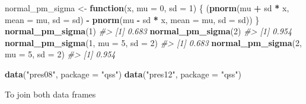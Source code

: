 \documentclass[]{book}
\newenvironment{Shaded}{\begin{snugshade}}{\end{snugshade}}
\newcommand{\CommentTok}[1]{\textcolor[rgb]{0.56,0.35,0.01}{\textit{#1}}}
\newcommand{\ControlFlowTok}[1]{\textcolor[rgb]{0.13,0.29,0.53}{\textbf{#1}}}
\newcommand{\DataTypeTok}[1]{\textcolor[rgb]{0.13,0.29,0.53}{#1}}
\newcommand{\DecValTok}[1]{\textcolor[rgb]{0.00,0.00,0.81}{#1}}
\newcommand{\KeywordTok}[1]{\textcolor[rgb]{0.13,0.29,0.53}{\textbf{#1}}}
\newcommand{\NormalTok}[1]{#1}
\newcommand{\OperatorTok}[1]{\textcolor[rgb]{0.81,0.36,0.00}{\textbf{#1}}}
\newcommand{\StringTok}[1]{\textcolor[rgb]{0.31,0.60,0.02}{#1}}
\theoremstyle{definition}
\theoremstyle{definition}
\theoremstyle{definition}
\theoremstyle{remark}
\begin{document}
\begin{Shaded}
\begin{Highlighting}[]
\NormalTok{normal_pm_sigma <-}\StringTok{ }\ControlFlowTok{function}\NormalTok{(x, }\DataTypeTok{mu =} \DecValTok{0}\NormalTok{, }\DataTypeTok{sd =} \DecValTok{1}\NormalTok{) \{}
\NormalTok{  (}\KeywordTok{pnorm}\NormalTok{(mu }\OperatorTok{+}\StringTok{ }\NormalTok{sd }\OperatorTok{*}\StringTok{ }\NormalTok{x, }\DataTypeTok{mean =}\NormalTok{ mu, }\DataTypeTok{sd =}\NormalTok{ sd) }\OperatorTok{-}
\StringTok{     }\KeywordTok{pnorm}\NormalTok{(mu }\OperatorTok{-}\StringTok{ }\NormalTok{sd }\OperatorTok{*}\StringTok{ }\NormalTok{x, }\DataTypeTok{mean =}\NormalTok{ mu, }\DataTypeTok{sd =}\NormalTok{ sd))}
\NormalTok{\}}
\KeywordTok{normal_pm_sigma}\NormalTok{(}\DecValTok{1}\NormalTok{)}
\CommentTok{#> [1] 0.683}
\KeywordTok{normal_pm_sigma}\NormalTok{(}\DecValTok{2}\NormalTok{)}
\CommentTok{#> [1] 0.954}
\KeywordTok{normal_pm_sigma}\NormalTok{(}\DecValTok{1}\NormalTok{, }\DataTypeTok{mu =} \DecValTok{5}\NormalTok{, }\DataTypeTok{sd =} \DecValTok{2}\NormalTok{)}
\CommentTok{#> [1] 0.683}
\KeywordTok{normal_pm_sigma}\NormalTok{(}\DecValTok{2}\NormalTok{, }\DataTypeTok{mu =} \DecValTok{5}\NormalTok{, }\DataTypeTok{sd =} \DecValTok{2}\NormalTok{)}
\CommentTok{#> [1] 0.954}
\end{Highlighting}
\end{Shaded}

\begin{Shaded}
\begin{Highlighting}[]
\KeywordTok{data}\NormalTok{(}\StringTok{"pres08"}\NormalTok{, }\DataTypeTok{package =} \StringTok{"qss"}\NormalTok{)}
\KeywordTok{data}\NormalTok{(}\StringTok{"pres12"}\NormalTok{, }\DataTypeTok{package =} \StringTok{"qss"}\NormalTok{)}
\end{Highlighting}
\end{Shaded}

To join both data frames

\begin{Shaded}
\end{Shaded}
\end{document}
